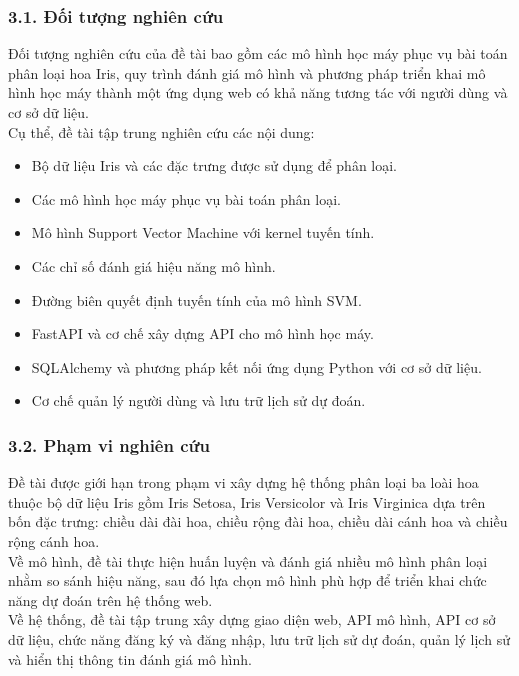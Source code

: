 \documentclass[14pt]{extarticle}
\begin{document}
		 \subsubsection*{3.1. Đối tượng nghiên cứu}
		 
		 \noindent Đối tượng nghiên cứu của đề tài bao gồm các mô hình học máy phục vụ bài toán phân loại hoa Iris, quy trình đánh giá mô hình và phương pháp triển khai mô hình học máy thành một ứng dụng web có khả năng tương tác với người dùng và cơ sở dữ liệu.\\
		 
		 \noindent Cụ thể, đề tài tập trung nghiên cứu các nội dung:
	      		 	 		\vspace{-0.5em}
		 \begin{itemize}
		 	\item Bộ dữ liệu Iris và các đặc trưng được sử dụng để phân loại.
		 	\item Các mô hình học máy phục vụ bài toán phân loại.
		 	\item Mô hình Support Vector Machine với kernel tuyến tính.
		 	\item Các chỉ số đánh giá hiệu năng mô hình.
		 	\item Đường biên quyết định tuyến tính của mô hình SVM.
		 	\item FastAPI và cơ chế xây dựng API cho mô hình học máy.
		 	\item SQLAlchemy và phương pháp kết nối ứng dụng Python với cơ sở dữ liệu.
		 	\item Cơ chế quản lý người dùng và lưu trữ lịch sử dự đoán.
		 \end{itemize}
		 \subsubsection*{3.2. Phạm vi nghiên cứu}
		 
		 \noindent Đề tài được giới hạn trong phạm vi xây dựng hệ thống phân loại ba loài hoa thuộc bộ dữ liệu Iris gồm Iris Setosa, Iris Versicolor và Iris Virginica dựa trên bốn đặc trưng: chiều dài đài hoa, chiều rộng đài hoa, chiều dài cánh hoa và chiều rộng cánh hoa.\\
		 
		 \noindent Về mô hình, đề tài thực hiện huấn luyện và đánh giá nhiều mô hình phân loại nhằm so sánh hiệu năng, sau đó lựa chọn mô hình phù hợp để triển khai chức năng dự đoán trên hệ thống web.\\
		 
		 \noindent Về hệ thống, đề tài tập trung xây dựng giao diện web, API mô hình, API cơ sở dữ liệu, chức năng đăng ký và đăng nhập, lưu trữ lịch sử dự đoán, quản lý lịch sử và hiển thị thông tin đánh giá mô hình.\\
		 
\end{document}
